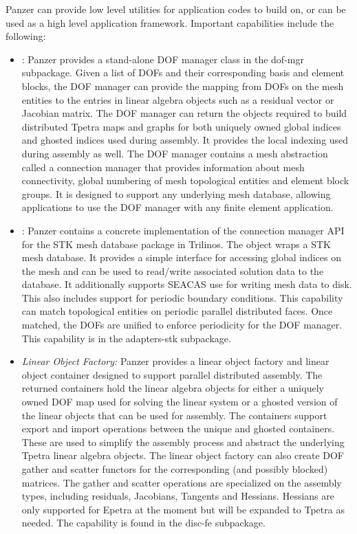 Panzer can provide low level utilities for application codes to build on, or can be used as a high level application framework. Important capabilities include the following:
\begin{itemize}
\item {}: Panzer provides a stand-alone DOF manager class in the dof-mgr subpackage. Given a list of DOFs and their corresponding basis and element blocks, the DOF manager can provide the mapping from DOFs on the mesh entities to the entries in linear algebra objects such as a residual vector or Jacobian matrix. The DOF manager can return the objects required to build distributed Tpetra 
maps and graphs for both uniquely owned global indices and ghosted indices used during assembly. 
It provides the local indexing used during assembly as well. The DOF manager contains a mesh abstraction called a connection manager that provides information about mesh connectivity, global numbering of mesh topological entities and element block groups. It is designed to support any underlying mesh database, allowing applications to use the DOF manager with any finite element application.
\item {}: Panzer contains a concrete implementation of the connection manager API for the STK mesh database package in Trilinos. The  object wraps a STK mesh database. It provides a simple interface for accessing global indices on the mesh and can be used to read/write associated solution data to the database. It additionally supports SEACAS use for writing mesh data to disk. This  also includes support for periodic boundary conditions.  This capability can match topological entities on periodic parallel distributed faces. Once matched, the DOFs are unified to enforce periodicity for the DOF manager. This capability is in the adapters-stk subpackage.
\item \emph{Linear Object Factory:} Panzer provides a linear object factory and linear object container designed to support parallel distributed assembly. 
The returned containers hold the linear algebra objects for either a uniquely owned DOF map used for solving the linear system or a ghosted version of the linear objects that can be used for assembly. The containers support export and import operations between the unique and ghosted containers. These are used to simplify the assembly process and abstract the underlying Tpetra linear algebra objects. %
The linear object factory can also create DOF gather and scatter functors for the corresponding (and possibly blocked) matrices. The gather and scatter operations are specialized on the assembly types, including residuals, Jacobians, Tangents and Hessians. Hessians are only supported for Epetra at the moment but will be expanded to Tpetra as needed. 
The capability is found in the disc-fe subpackage.


\end{itemize}
